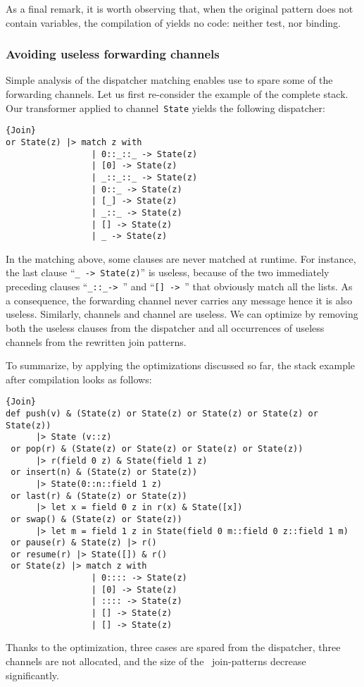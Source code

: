 \documentclass{LMCS}
\let \lst \lstinline
\renewcommand{\_}{\mathord{\rule[-.25ex]{1ex}{.15ex}}}
\begin{document}
As a final remark, it is worth observing that, when the original
pattern does not contain variables, the compilation of
 yields no code: neither test, nor
binding.

\subsubsection{Avoiding useless forwarding channels}
\label{subsubsec.remove}
Simple analysis of the dispatcher matching enables use to spare some
of the forwarding channels.  Let us first re-consider the example of
the complete stack. Our transformer  applied to channel~\lst|State|
yields the following dispatcher:
\begin{lstlisting}{Join}
or State(z) |> match z with
                 | 0::_::_ -> State(z)
                 | [0] -> State(z)
                 | _::_::_ -> State(z)
                 | 0::_ -> State(z)
                 | [_] -> State(z)
                 | _::_ -> State(z)
                 | [] -> State(z)
                 | _ -> State(z)
\end{lstlisting}
In the matching above, some clauses are never matched at runtime.  For
instance, the last clause ``\lst|_ -> State(z)|'' is
useless, because of the two immediately preceding clauses
``\lst"_::_->"~'' and ``\lst"[] ->"~'' that obviously
match all the lists.  As a consequence, the forwarding channel
 never carries any message hence it is also
useless.  Similarly, channels  and channel
 are useless. We can optimize by removing both the
useless clauses from the dispatcher and all occurrences of useless
channels from the rewritten join patterns.

To summarize, by applying the optimizations discussed so far, the
stack example after compilation looks as follows:
\begin{lstlisting}{Join}
def push(v) & (State(z) or State(z) or State(z) or State(z) or State(z))
      |> State (v::z) 
 or pop(r) & (State(z) or State(z) or State(z) or State(z))
      |> r(field 0 z) & State(field 1 z)
 or insert(n) & (State(z) or State(z))
      |> State(0::n::field 1 z)
 or last(r) & (State(z) or State(z))
      |> let x = field 0 z in r(x) & State([x])
 or swap() & (State(z) or State(z))
      |> let m = field 1 z in State(field 0 m::field 0 z::field 1 m)
 or pause(r) & State(z) |> r()
 or resume(r) |> State([]) & r()
 or State(z) |> match z with
                 | 0:::: -> State(z)
                 | [0] -> State(z)
                 | :::: -> State(z)
                 | [] -> State(z)
                 | [] -> State(z)
\end{lstlisting}
Thanks to the optimization, three cases are spared from the
dispatcher, three channels are not allocated, and the size of the
~join-patterns decrease significantly.
\end{document}
